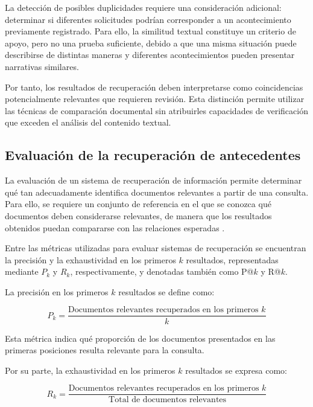 La detección de posibles duplicidades requiere una consideración adicional: determinar si diferentes solicitudes podrían corresponder a un acontecimiento previamente registrado. Para ello, la similitud textual constituye un criterio de apoyo, pero no una prueba suficiente, debido a que una misma situación puede describirse de distintas maneras y diferentes acontecimientos pueden presentar narrativas similares.

Por tanto, los resultados de recuperación deben interpretarse como coincidencias potencialmente relevantes que requieren revisión. Esta distinción permite utilizar las técnicas de comparación documental sin atribuirles capacidades de verificación que exceden el análisis del contenido textual.

\subsection{Evaluación de la recuperación de antecedentes}

La evaluación de un sistema de recuperación de información permite determinar qué tan adecuadamente identifica documentos relevantes a partir de una consulta. Para ello, se requiere un conjunto de referencia en el que se conozca qué documentos deben considerarse relevantes, de manera que los resultados obtenidos puedan compararse con las relaciones esperadas \cite{manning2008ir}.

Entre las métricas utilizadas para evaluar sistemas de recuperación se encuentran la precisión y la exhaustividad en los primeros $k$ resultados, representadas mediante
$P_k$ y $R_k$, respectivamente, y denotadas también como P@$k$ y R@$k$.

La precisión en los primeros $k$ resultados se define como:

\begin{equation}
    P_k =
    \frac{\text{Documentos relevantes recuperados en los primeros } k}
    {k}
    \label{eq:precision_k}
\end{equation}

Esta métrica indica qué proporción de los documentos presentados en las primeras posiciones resulta relevante para la consulta.

Por su parte, la exhaustividad en los primeros $k$ resultados se expresa como:

\begin{equation}
    R_k =
    \frac{\text{Documentos relevantes recuperados en los primeros } k}
    {\text{Total de documentos relevantes}}
    \label{eq:recall_k}
\end{equation}

